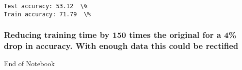 \documentclass[11pt]{article}
\begin{document}
    \begin{Verbatim}[commandchars=\\\{\}]
Test accuracy: 53.12  \%
Train accuracy: 71.79  \%
    \end{Verbatim}

    \hypertarget{reducing-training-time-by-150-times-the-original-for-a-4-drop-in-accuracy.-with-enough-data-this-could-be-rectified}{%
\subsubsection{Reducing training time by 150 times the original for a
4\% drop in accuracy. With enough data this could be
rectified}\label{reducing-training-time-by-150-times-the-original-for-a-4-drop-in-accuracy.-with-enough-data-this-could-be-rectified}}

    End of Notebook


    
    
    
\end{document}
